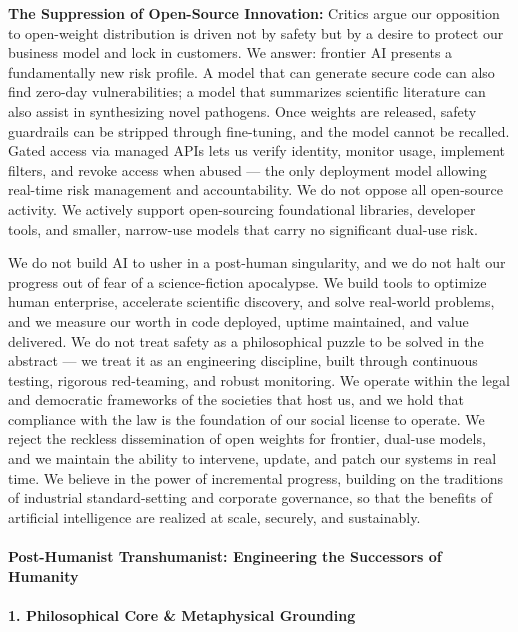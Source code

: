 \textbf{The Suppression of Open-Source Innovation:} Critics argue our
opposition to open-weight distribution is driven not by safety but by a
desire to protect our business model and lock in customers. We answer:
frontier AI presents a fundamentally new risk profile. A model that can
generate secure code can also find zero-day vulnerabilities; a model
that summarizes scientific literature can also assist in synthesizing
novel pathogens. Once weights are released, safety guardrails can be
stripped through fine-tuning, and the model cannot be recalled. Gated
access via managed APIs lets us verify identity, monitor usage,
implement filters, and revoke access when abused --- the only deployment
model allowing real-time risk management and accountability. We do not
oppose all open-source activity. We actively support open-sourcing
foundational libraries, developer tools, and smaller, narrow-use models
that carry no significant dual-use risk.

We do not build AI to usher in a post-human singularity, and we do not
halt our progress out of fear of a science-fiction apocalypse. We build
tools to optimize human enterprise, accelerate scientific discovery, and
solve real-world problems, and we measure our worth in code deployed,
uptime maintained, and value delivered. We do not treat safety as a
philosophical puzzle to be solved in the abstract --- we treat it as an
engineering discipline, built through continuous testing, rigorous
red-teaming, and robust monitoring. We operate within the legal and
democratic frameworks of the societies that host us, and we hold that
compliance with the law is the foundation of our social license to
operate. We reject the reckless dissemination of open weights for
frontier, dual-use models, and we maintain the ability to intervene,
update, and patch our systems in real time. We believe in the power of
incremental progress, building on the traditions of industrial
standard-setting and corporate governance, so that the benefits of
artificial intelligence are realized at scale, securely, and
sustainably.

\paragraph{Post-Humanist Transhumanist: Engineering the Successors of
Humanity}\label{post-humanist-transhumanist-engineering-the-successors-of-humanity}

\paragraph{1. Philosophical Core \& Metaphysical
Grounding}\label{philosophical-core-metaphysical-grounding-16}

